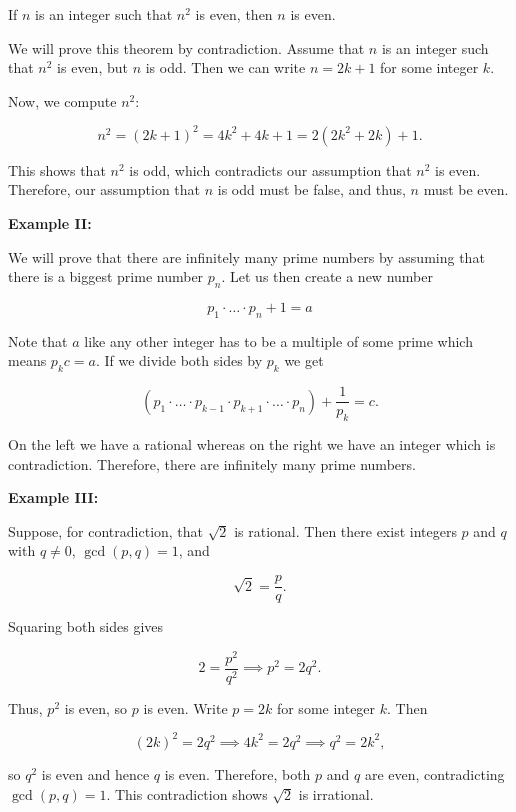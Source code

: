 If \(n\) is an integer such that \( n^2 \) is even, then \(n\) is even.

We will prove this theorem by contradiction. Assume that \(n\) is an integer such that \( n^2 \) is
even, but \(n\) is odd. Then we can write \( n = 2k + 1 \) for some integer \(k\).

Now, we compute \( n^2 \):

\[
	n^2 = {(2k + 1)}^2 = 4k^2 + 4k + 1 = 2(2k^2 + 2k) + 1.
\]

This shows that \( n^2 \) is odd, which contradicts our assumption that \( n^2 \) is even. Therefore, our
assumption that \(n\) is odd must be false, and thus, \(n\) must be even.

\QED

\textbf{Example II:}

We will prove that there are infinitely many prime numbers by assuming that there is a biggest prime number \(p_n\).
Let us then create a new number

\[
	p_1 \cdot \dots \cdot p_n + 1 = a
\]

Note that \(a\) like any other integer has to be a multiple of some prime which means \(p_kc = a\). If we divide both
sides by \(p_k\) we get

\[
	(p_1 \cdot \dots \cdot p_{k - 1} \cdot p_{k + 1} \cdot \dots \cdot p_n) + \frac{1}{p_k} = c.
\]

On the left we have a rational whereas on the right we have an integer which is contradiction. Therefore,
there are infinitely many prime numbers.

\QED

\textbf{Example III:}

Suppose, for contradiction, that \(\sqrt{2}\) is rational. Then there exist integers \(p\) and \(q\)
with \(q \neq 0\), \(\gcd(p,q) = 1\), and

\[
	\sqrt{2}=\frac{p}{q}.
\]

Squaring both sides gives

\[
	2 = \frac{p^2}{q^2} \implies p^2=2q^2.
\]

Thus, \(p^2\) is even, so \(p\) is even. Write \(p=2k\) for some integer \(k\). Then

\[
	(2k)^2=2q^2 \implies 4k^2=2q^2 \implies q^2=2k^2,
\]

so \(q^2\) is even and hence \(q\) is even. Therefore, both \(p\) and \(q\) are even, contradicting
\(\gcd(p,q)=1\). This contradiction shows \(\sqrt{2}\) is irrational.

\QED


